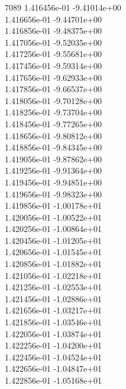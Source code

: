 7089	1.416456e-01	-9.41014e+00	\\ 	1.416656e-01	-9.44701e+00	\\ 	1.416856e-01	-9.48375e+00	\\ 	1.417056e-01	-9.52035e+00	\\ 	1.417256e-01	-9.55681e+00	\\ 	1.417456e-01	-9.59314e+00	\\ 	1.417656e-01	-9.62933e+00	\\ 	1.417856e-01	-9.66537e+00	\\ 	1.418056e-01	-9.70128e+00	\\ 	1.418256e-01	-9.73704e+00	\\ 	1.418456e-01	-9.77265e+00	\\ 	1.418656e-01	-9.80812e+00	\\ 	1.418856e-01	-9.84345e+00	\\ 	1.419056e-01	-9.87862e+00	\\ 	1.419256e-01	-9.91364e+00	\\ 	1.419456e-01	-9.94851e+00	\\ 	1.419656e-01	-9.98323e+00	\\ 	1.419856e-01	-1.00178e+01	\\ 	1.420056e-01	-1.00522e+01	\\ 	1.420256e-01	-1.00864e+01	\\ 	1.420456e-01	-1.01205e+01	\\ 	1.420656e-01	-1.01545e+01	\\ 	1.420856e-01	-1.01882e+01	\\ 	1.421056e-01	-1.02218e+01	\\ 	1.421256e-01	-1.02553e+01	\\ 	1.421456e-01	-1.02886e+01	\\ 	1.421656e-01	-1.03217e+01	\\ 	1.421856e-01	-1.03546e+01	\\ 	1.422056e-01	-1.03874e+01	\\ 	1.422256e-01	-1.04200e+01	\\ 	1.422456e-01	-1.04524e+01	\\ 	1.422656e-01	-1.04847e+01	\\ 	1.422856e-01	-1.05168e+01	\\ \hline
